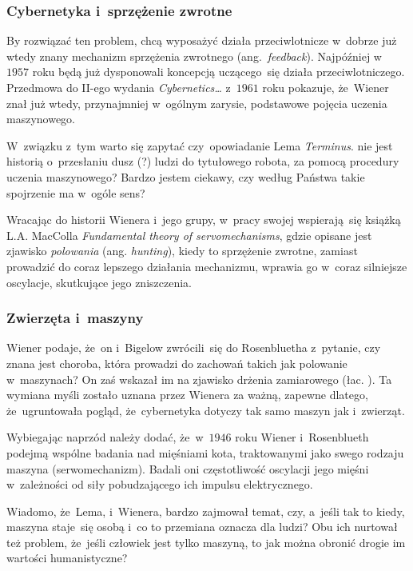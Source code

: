 \documentclass[10pt,t]{beamer}
\begin{document}
\begin{frame}
  \frametitle{Cybernetyka i~sprzężenie zwrotne}


  By rozwiązać ten problem, chcą wyposażyć działa przeciwlotnicze
  w~dobrze już wtedy znany
  mechanizm sprzężenia zwrotnego (ang.~\textit{feedback}). Najpóźniej
  w~$1957$ roku będą już dysponowali koncepcją uczącego~się działa
  przeciwlotniczego. Przedmowa do II-ego wydania \textit{Cybernetics\ldots}
  z~$1961$ roku pokazuje, że~Wiener znał już wtedy, przynajmniej w~ogólnym
  zarysie, podstawowe pojęcia uczenia maszynowego.

  W~związku z~tym warto się zapytać czy~opowiadanie Lema \textit{Terminus}.
  nie jest historią o~przesłaniu dusz (?) ludzi do tytułowego robota, za
  pomocą procedury uczenia maszynowego? Bardzo jestem ciekawy, czy według
  Państwa takie spojrzenie ma w~ogóle sens?

  Wracając do historii Wienera i~jego grupy, w~pracy swojej wspierają~się
  książką L.A. MacColla
  {\textit{Fundamental theory of servomechanisms}}, gdzie opisane jest
  zjawisko \textit{polowania} (ang. \textit{hunting}), kiedy to
  sprzężenie zwrotne, zamiast prowadzić do coraz lepszego działania
  mechanizmu, wprawia go w~coraz silniejsze oscylacje, skutkujące jego
  zniszczenia.

\end{frame}





\begin{frame}
  \frametitle{Zwierzęta i~maszyny}


  Wiener podaje, że~on i~Bigelow zwrócili~się do Rosenbluetha z~pytanie, czy
  znana jest choroba, która prowadzi do zachowań takich jak polowanie
  w~maszynach? On zaś wskazał im na zjawisko drżenia zamiarowego
  (łac.
  ). Ta wymiana myśli zostało uznana przez Wienera za
  ważną, zapewne dlatego, że~ugruntowała pogląd, że~cybernetyka dotyczy
  tak samo maszyn jak i~zwierząt.

  Wybiegając naprzód należy dodać, że~w~$1946$ roku Wiener i~Rosenblueth
  podejmą wspólne badania nad mięśniami kota, traktowanymi jako swego
  rodzaju maszyna (serwomechanizm). Badali oni częstotliwość oscylacji
  jego mięśni w~zależności od siły pobudzającego ich impulsu elektrycznego.

  Wiadomo, że~Lema, i~Wienera, bardzo zajmował temat, czy, a~jeśli tak to
  kiedy, maszyna staje~się osobą i~co to przemiana oznacza dla ludzi?
  Obu ich nurtował też problem, że~jeśli człowiek jest tylko maszyną, to jak
  można obronić drogie im wartości humanistyczne?

\end{frame}
\end{document}
